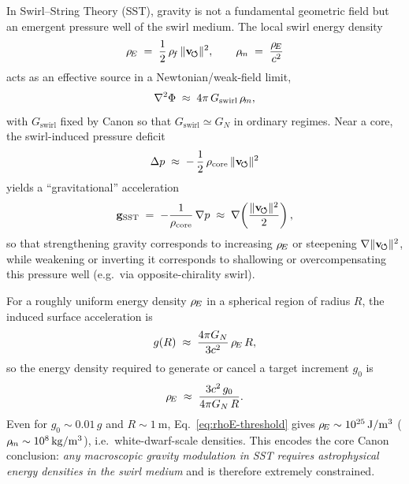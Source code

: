 \documentclass[11pt]{article}
\newcommand{\rhof}{\rho_{\!f}}
\newcommand{\rhocore}{\rho_{\text{core}}}
\begin{document}
            In Swirl--String Theory (SST), gravity is not a fundamental geometric field but an emergent pressure well of the swirl medium. The local swirl energy density
            \begin{equation}
                \rhoE \;=\; \frac{1}{2}\,\rhof\,\vnorm^{2},
                \qquad
                \rhoM \;=\; \frac{\rhoE}{c^{2}}
            \end{equation}
            acts as an effective source in a Newtonian/weak-field limit,
            \begin{equation}
                \nabla^{2} \Phi \;\approx\; 4\pi\,G_{\text{swirl}}\,\rho_{\!m},
                \label{eq:SST-Poisson}
            \end{equation}
            with $G_{\text{swirl}}$ fixed by Canon so that $G_{\text{swirl}}\simeq G_{N}$ in ordinary regimes. Near a core, the swirl-induced pressure deficit
            \begin{equation}
                \Delta p \;\approx\; -\,\frac{1}{2}\,\rhocore\,\vnorm^{2}
            \end{equation}
            yields a ``gravitational'' acceleration
            \begin{equation}
                \mathbf{g}_{\text{SST}}
                \;=\; -\frac{1}{\rhocore}\,\nabla p
                \;\approx\; \nabla\!\left(\frac{\vnorm^{2}}{2}\right),
            \end{equation}
            so that strengthening gravity corresponds to increasing $\rho_{\!E}$ or steepening $\nabla\lVert \mathbf{v}_{\!\boldsymbol{\circlearrowleft}}\rVert^{2}$, while weakening or inverting it corresponds to shallowing or overcompensating this pressure well (e.g.\ via opposite-chirality swirl).

            For a roughly uniform energy density $\rho_{\!E}$ in a spherical region of radius $R$, the induced surface acceleration is
            \begin{equation}
                g(R) \;\approx\; \frac{4\pi G_{N}}{3c^{2}}\,\rho_{\!E}\,R,
            \end{equation}
            so the energy density required to generate or cancel a target increment $g_{0}$ is
            \begin{equation}
                \rho_{\!E} \;\approx\; \frac{3c^{2}\,g_{0}}{4\pi G_{N}\,R}.
                \label{eq:rhoE-threshold}
            \end{equation}
            Even for $g_{0}\sim 0.01\,g$ and $R\sim1~\mathrm{m}$, Eq.~\eqref{eq:rhoE-threshold} gives $\rho_{\!E}\sim 10^{25}\,\mathrm{J/m^{3}}$ ($\rho_{\!m}\sim 10^{8}\,\mathrm{kg/m^{3}}$), i.e.\ white-dwarf-scale densities. This encodes the core Canon conclusion: \emph{any macroscopic gravity modulation in SST requires astrophysical energy densities in the swirl medium} and is therefore extremely constrained.
\end{document}
